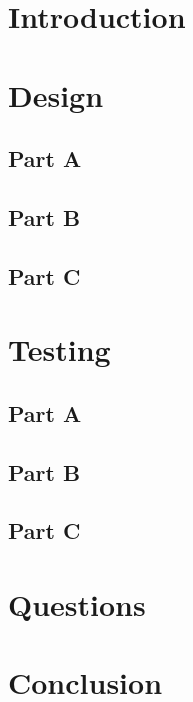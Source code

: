 \documentclass[10pt, letterpaper, titlepage]{article} %
\title{\textbf{\Huge{
\begin{center}
Introduction to\\ Subroutines \\
\end{center}
}}}
\author{\B enjamin Kong | 1573684\\Lora Ma ||||| 1570935\\ \\ECE 212 Lab Section H11}
\begin{document}
 
\maketitle 
\thispagestyle{empty}
\tableofcontents 
\newpage
{}

\begin{multicols*}{2}


\section{Introduction}


\section{Design}
\subsection{Part A}


\subsection{Part B}


\subsection{Part C}


\section{Testing}
\subsection{Part A}


\subsection{Part B}


\subsection{Part C}


\section{Questions}


\section{Conclusion}



\end{multicols*}
\end{document}
